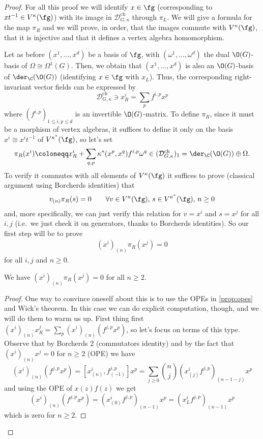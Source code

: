 \documentclass[a4paper, 10pt]{article}
\newcommand{\Dc}{ \mathcal{D}^{\mathrm{ch}}_{G, \kappa} }         %
\begin{document}
            \begin{proof}
                For all this proof we will identify $x \in \fg$ (corresponding to $xt^{-1} \in V^{\kappa}(\fg)$) with its image in $\Dc$ through $\pi_L$.
                We will give a formula for the map $\pi_R$ and we will prove, in order, that the images commute with $V^{\kappa}(\fg)$, that it is injective and that it defines a vertex algebra homomorphism.

                Let as before $(x^1, \dots, x^d)$ be a basis of $\fg$, with $(\omega^1, \dots, \omega^d)$ the dual $\O(G)$-basis of $\Omega \cong \Omega^1(G)$. Then, we obtain that $(x^1, \dots, x^d)$ is also an $\O(G)$-basis of $\der_{\C}(\O(G))$ (identifying $x \in \fg$ with $x_L$). Thus, the corresponding right-invariant vector fields can be expressed by \[\Dc \ni x^i_R = \sum_p f^{i,p}x^p \] where $(f^{i, p})_{1 \leq i,p \leq d}$ is an invertible $\O(G)$-matrix.
                To define $\pi_R$, since it must be a morphism of vertex algebras, it suffices to define it only on the basis $x^i \cong x^it^{-1}$ of $V^{\kappa^*}(\fg)$, so let's set \[\pi_R(x^i) \coloneqq x^i_R + \sum_{q, p} \kappa^*(x^p, x^q)f^{i,p}\omega^q \in (\Dc)_1 = \der_{\C}(\O(G)) \oplus \Omega. \] To verify it commutes with all elements of $V^{\kappa}(\fg)$ it suffices to prove (classical argument using Borcherds identities) that \[v_{(n)}\pi_R(s) = 0 \qquad \forall v \in V^{\kappa}(\fg),\, s \in V^{\kappa^*}(\fg),\, n \geq 0 \] and, more specifically, we can just verify this relation for $v = x^i$ and $s=x^j$ for all $i, j$ (i.e.\ we just check it on generators, thanks to Borcherds identities).
                So our first step will be to prove 
                \begin{gather}
                    (x^i)_{(n)}\pi_R(x^j) = 0 
                \end{gather} 
                for all $i, j$ and $n \geq 0$. 
                \begin{lemma}
                    We have $(x^i)_{(n)}\pi_R(x^j)=0$ for all $n \geq 2$.
                \end{lemma}
                \begin{proof}
                    One way to convince oneself about this is to use the OPEs in \cref{prop:opes} and Wick's theorem. In this case we can do explicit computation, though, and we will do them to warm us up.
                    First thing first $(x^i)_{(n)}x^j_R = \sum_p (x^i)_{(n)}(f^{j,p}x^p)$, so let's focus on terms of this type. Observe that by Borcherds 2 (commutators identity) and by the fact that $(x^i)_{(n)}x^j = 0$ for $n \geq 2$ (OPE) we have \[(x^i)_{(n)}(f^{j,p}x^p) = [x^i_{(n)}, f^{j,p}_{(-1)}]x^p = \sum_{j \geq 0} \binom{n}{j} (x^i_{(j)}f^{j, p})_{(n-1-j)}x^p \] and using the OPE of $x(z)f(z)$ we get \[(x^i)_{(n)}(f^{j,p}x^p) = (x^i_{(0)}f^{j,p})_{(n-1)}x^p = (x^i_Lf^{j,p})_{(n-1)}x^p  \] which is zero for $n \geq 2$. 


\end{proof}
\end{proof}
\end{document}
